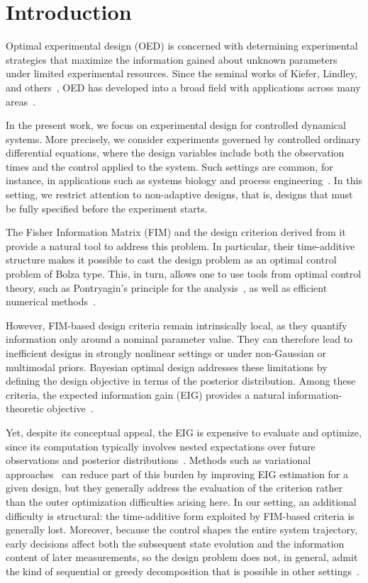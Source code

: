 \documentclass[a4paper,11pt]{article}
\begin{document}
\section{Introduction}

Optimal experimental design (OED) is concerned with determining experimental strategies that maximize the information gained about unknown parameters under limited experimental resources. Since the seminal works of Kiefer, Lindley, and others~\cite{Kiefer1958,Lindley1956,Stone1959}, OED has developed into a broad field with applications across many areas~\cite{Martijn2005,Huan_Jagalur_Marzouk_2024}.

In the present work, we focus on experimental design for controlled dynamical systems. More precisely, we consider experiments governed by controlled ordinary differential equations, where the design variables include both the observation times and the control applied to the system. Such settings are common, for instance, in applications such as systems biology and process engineering~\cite{Kreutz2009,Franceschini2008}. 
In this setting, we restrict attention to non-adaptive designs, that is, designs that must be fully specified before the experiment starts.

The Fisher Information Matrix {\color{blue}(FIM)} and the design criterion derived from it provide a natural tool to address this problem. In particular, their time-additive structure makes it possible to cast the design problem as an optimal control problem of Bolza type. This, in turn, allows one to use tools from optimal control theory, such as Pontryagin’s principle for the analysis~\cite{Sager2013}, as well as efficient numerical methods~\cite{Korkel2004}. 

However, FIM-based design criteria remain intrinsically local, as they quantify information only around a nominal parameter value. They can therefore lead to inefficient designs in strongly nonlinear settings or under non-Gaussian or multimodal priors. Bayesian optimal design addresses these limitations by defining the design objective in terms of the posterior distribution. Among these criteria, the expected information gain (EIG) provides a natural information-theoretic objective~\cite{chalonerverdinelli1995,Ryan2016}.


Yet, despite its conceptual appeal, the EIG is expensive to evaluate and optimize, since its computation typically involves nested expectations over future observations and posterior distributions~\cite{Rainforth2018}. Methods such as variational approaches~\cite{Foster2019} can reduce part of this burden by improving EIG estimation for a given design, but they generally address the evaluation of the criterion rather than the outer optimization difficulties arising here. In our setting, an additional difficulty is structural: the time-additive form exploited by FIM-based criteria is generally lost. Moreover, because the control shapes the entire system trajectory, early decisions affect both the subsequent state evolution and the information content of later measurements, so the design problem does not, in general, admit the kind of sequential or greedy decomposition that is possible in other settings~\cite{Krause2008, maio2025}.
\end{document}
